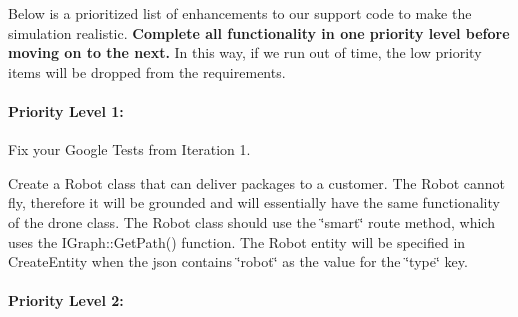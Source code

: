 Below is a prioritized list of enhancements to our support code to make the simulation realistic. {\bfseries Complete all functionality in one priority level before moving on to the next.} In this way, if we run out of time, the low priority items will be dropped from the requirements.

\paragraph*{Priority Level 1\+:}


\begin{DoxyEnumerate}
\item Fix your Google Tests from Iteration 1.
\item Create a Robot class that can deliver packages to a customer. The Robot cannot fly, therefore it will be grounded and will essentially have the same functionality of the drone class. The Robot class should use the \char`\"{}smart\char`\"{} route method, which uses the I\+Graph\+::\+Get\+Path() function. The Robot entity will be specified in Create\+Entity when the json contains \char`\"{}robot\char`\"{} as the value for the \char`\"{}type\char`\"{} key.
\end{DoxyEnumerate}

\paragraph*{Priority Level 2\+:}


